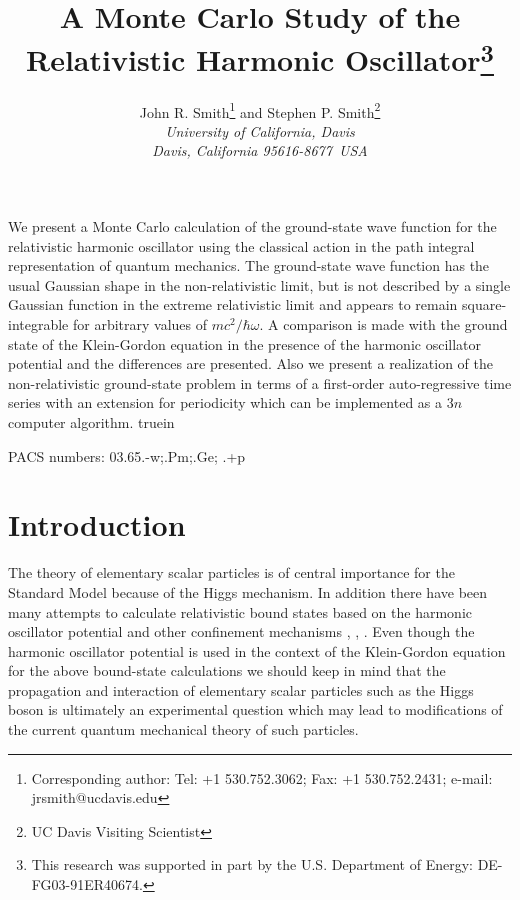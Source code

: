 \def\pt{\mbox{$p_{t}$}\ }
\def\be{\begin{equation}}
\def\ee{\end{equation}}
\def\btopipi{\rm B \rightarrow \pi^+\pi^-}

\topmargin=10mm
\textheight=215mm
\textwidth=160mm
\pagestyle{plain}

\begin{titlepage}
\date{}
\title{A Monte Carlo Study of the Relativistic
Harmonic Oscillator\footnote{This 
research was supported in part by the U.S. Department
of Energy: DE-FG03-91ER40674.} }
\author{John R. Smith\footnote{Corresponding author: Tel: +1 530.752.3062; 
Fax: +1 530.752.2431; e-mail: jrsmith@ucdavis.edu} 
and Stephen P. Smith\footnote{UC Davis Visiting Scientist}  \\
{\em University of California, Davis}\\
{\em Davis, California 95616-8677\ USA}}
We present a Monte Carlo calculation of the ground-state
wave function for the relativistic harmonic oscillator using the 
classical action in the path integral representation of quantum mechanics.
The ground-state wave function has the usual Gaussian shape in the 
non-relativistic limit, but is not described by a single Gaussian 
function in the extreme relativistic limit and appears to remain 
square-integrable for arbitrary values of $mc^2/\hbar\omega$.
A comparison is made with the ground state of the Klein-Gordon
equation in the presence of the harmonic oscillator potential and
the differences are presented.
Also we present a realization of the non-relativistic 
ground-state problem in terms
of a first-order auto-regressive time series with an extension for
periodicity which can be 
implemented as a $3n$ computer algorithm.
 truein
\centerline{PACS numbers: 03.65.-w;.Pm;.Ge;
.+p}
\end{titlepage}
%
\section{Introduction }
The theory of elementary sca\-lar particles is of central importance 
for the Standard Model because of the Higgs mechanism. In addition
there have been many attempts to calculate relativistic bound states 
based on the harmonic oscillator potential and other confinement
mechanisms \cite{bib:gunion1}, \cite{bib:gunion2}, \cite{bib:hey}.
Even though the harmonic oscillator potential is used 
in the context of the Klein-Gordon equation 
for the above bound-state calculations we
should keep in mind that the propagation and interaction of 
elementary sca\-lar particles such as the 
Higgs boson is ultimately an experimental question which may lead to 
modifications of the current quantum mechanical theory of such particles.

